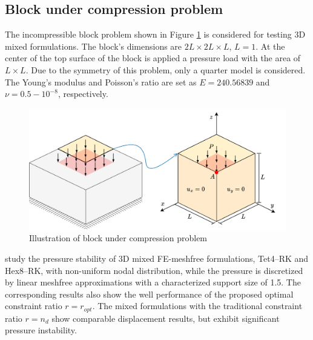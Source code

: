 \subsection{Block under compression problem}
The incompressible block problem \DIFaddbegin {}\DIFaddend shown in Figure \ref{fg:block_model} is considered for testing 3D mixed formulations. The block's dimensions are $2L\times 2L \times L$, $L=1$.
At the center of the top surface of the block is applied a pressure load  \DIFaddbegin {}\DIFaddend with the area of $L\times L$.
Due to the symmetry of this problem, only a quarter model is considered.
The Young's modulus and Poisson's ratio are set as $E = 240.56839$ and $\nu = 0.5-10^{-8}$, respectively.

\begin{figure}[H]
\centering
 \DIFaddbeginFL \includegraphics[width=\textwidth]{png/block_model_r1.png}
\DIFaddendFL \caption{Illustration of block under compression problem}\label{fg:block_model}
\end{figure}

 \DIFaddbegin {}\DIFaddend study the pressure stability of 3D mixed FE-meshfree formulations, Tet4--RK and Hex8--RK, with non-uniform nodal distribution, while the pressure is discretized by linear meshfree approximations with a characterized support size of 1.5. The corresponding results also show the well performance of the proposed optimal constraint ratio $r=r_{opt}$. The mixed formulations with the traditional constraint ratio $r=n_d$ show comparable displacement results, but exhibit significant pressure instability.
\DIFaddbegin 

